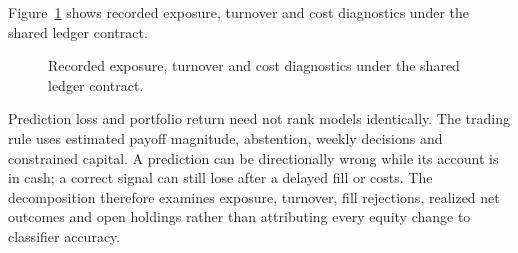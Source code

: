 \documentclass[11pt,a4paper]{article}
\begin{document}
\noindent Figure~\ref{fig:11} shows recorded exposure, turnover and cost diagnostics under the shared ledger contract.

\begin{figure}[htbp]\centering
\begin{minipage}[t]{.48\linewidth}\centering
{}
\end{minipage}
\hfill
\begin{minipage}[t]{.48\linewidth}\centering
{}
\end{minipage}

\caption{Recorded exposure, turnover and cost diagnostics under the shared ledger contract.}\label{fig:11}
\end{figure}

Prediction loss and portfolio return need not rank models identically. The trading rule uses estimated payoff magnitude, abstention, weekly decisions and constrained capital. A prediction can be directionally wrong while its account is in cash; a correct signal can still lose after a delayed fill or costs. The decomposition therefore examines exposure, turnover, fill rejections, realized net outcomes and open holdings rather than attributing every equity change to classifier accuracy.
\end{document}
